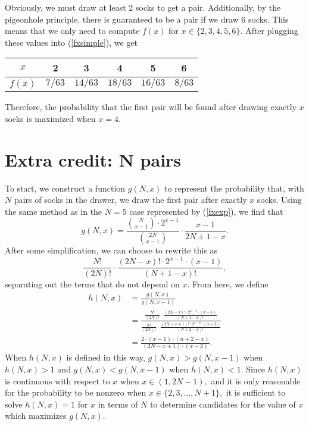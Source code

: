 \documentclass{article}
\begin{document}
Obviously, we must draw at least 2 socks to get a pair. Additionally, by the pigeonhole principle, there is guaranteed to be a pair if we draw 6 socks. This means that we only need to compute $f(x)$ for $x \in \{2, 3, 4, 5, 6\}.$ After plugging these values into (\ref{fxsimple}), we get

\begin{table}[H]
\centering
\begin{tabular}{| c | c | c | c | c | c |}
\hline
$x$ & 2 & 3 & 4 & 5 & 6 \\
\hline
$f(x)$ & $7/63$ & $14/63$ & $18/63$ & $16/63$ & $8/63$ \\
\hline
\end{tabular}
\end{table}

Therefore, the probability that the first pair will be found after drawing exactly $x$ socks is maximized when $x = 4.$

\section{Extra credit: N pairs}

To start, we construct a function $g(N, x)$ to represent the probability that, with $N$ pairs of socks in the drawer, we draw the first pair after exactly $x$ socks. Using the same method as in the $N = 5$ case represented by (\ref{fxexp}), we find that
\begin{equation}\label{gnxexp}
g(N,x) = \frac{{N \choose {x-1}} \cdot 2^{x-1}}{{{2N} \choose {x-1}}} \cdot \frac{x-1}{2N + 1 - x}.
\end{equation}
After some simplification, we can choose to rewrite this as
\begin{equation}\label{gnxseparated}
\frac{N!}{(2N)!} \cdot \frac{(2N - x)! \cdot 2^{x-1} \cdot (x-1)}{(N+1-x)!},
\end{equation}
separating out the terms that do not depend on $x$. From here, we define
\begin{align}
h(N,x) &= \frac{g(N,x)}{g(N,x-1)} \\
	&= \frac{\frac{N!}{(2N)!} \cdot \frac{(2N - x)! \cdot 2^{x-1} \cdot (x-1)}{(N+1-x)!}}{\frac{N!}{(2N)!} \cdot \frac{(2N - x + 1)! \cdot 2^{x-2} \cdot (x-2)}{(N+2-x)!}} \\
	&= \frac{2 \cdot (x-1) \cdot (n+2 - x)}{(2N - x + 1) \cdot (x-2)}. \label{hnx}
\end{align}
When $h(N, x)$ is defined in this way, $g(N, x) > g(N, x-1)$ when $h(N, x) > 1$ and $g(N, x) < g(N, x-1)$ when $h(N, x) < 1.$ Since $h(N,x)$ is continuous with respect to $x$ when $x \in (1, 2N-1),$ and it is only reasonable for the probability to be nonzero when $x \in \{2, 3, \ldots, N+1\},$ it is sufficient to solve $h(N,x) = 1$ for $x$ in terms of $N$ to determine candidates for the value of $x$ which maximizes $g(N,x).$
\end{document}

